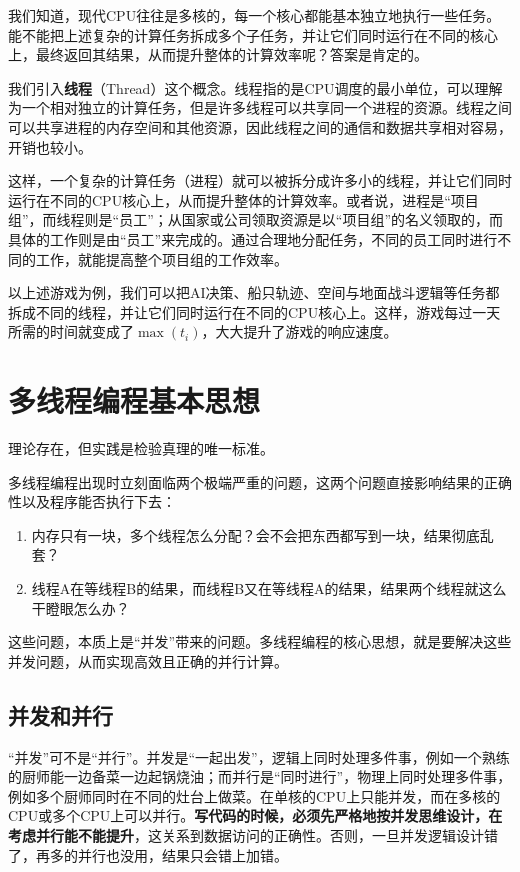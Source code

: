 我们知道，现代CPU往往是多核的，每一个核心都能基本独立地执行一些任务。能不能把上述复杂的计算任务拆成多个子任务，并让它们同时运行在不同的核心上，最终返回其结果，从而提升整体的计算效率呢？答案是肯定的。

我们引入\textbf{线程}（Thread）这个概念。线程指的是CPU调度的最小单位，可以理解为一个相对独立的计算任务，但是许多线程可以共享同一个进程的资源。线程之间可以共享进程的内存空间和其他资源，因此线程之间的通信和数据共享相对容易，开销也较小。

这样，一个复杂的计算任务（进程）就可以被拆分成许多小的线程，并让它们同时运行在不同的CPU核心上，从而提升整体的计算效率。或者说，进程是“项目组”，而线程则是“员工”；从国家或公司领取资源是以“项目组”的名义领取的，而具体的工作则是由“员工”来完成的。通过合理地分配任务，不同的员工同时进行不同的工作，就能提高整个项目组的工作效率。

以上述游戏为例，我们可以把AI决策、船只轨迹、空间与地面战斗逻辑等任务都拆成不同的线程，并让它们同时运行在不同的CPU核心上。这样，游戏每过一天所需的时间就变成了$\max(t_i)$，大大提升了游戏的响应速度。

\section{多线程编程基本思想}

理论存在，但实践是检验真理的唯一标准。

多线程编程出现时立刻面临两个极端严重的问题，这两个问题直接影响结果的正确性以及程序能否执行下去：
\begin{enumerate}
    \item 内存只有一块，多个线程怎么分配？会不会把东西都写到一块，结果彻底乱套？
    \item 线程A在等线程B的结果，而线程B又在等线程A的结果，结果两个线程就这么干瞪眼怎么办？
\end{enumerate}
这些问题，本质上是“并发”带来的问题。多线程编程的核心思想，就是要解决这些并发问题，从而实现高效且正确的并行计算。

\subsection{并发和并行}

“并发”可不是“并行”。并发是“一起出发”，逻辑上同时处理多件事，例如一个熟练的厨师能一边备菜一边起锅烧油；而并行是“同时进行”，物理上同时处理多件事，例如多个厨师同时在不同的灶台上做菜。在单核的CPU上只能并发，而在多核的CPU或多个CPU上可以并行。\textbf{写代码的时候，必须先严格地按并发思维设计，在考虑并行能不能提升}，这关系到数据访问的正确性。否则，一旦并发逻辑设计错了，再多的并行也没用，结果只会错上加错。

